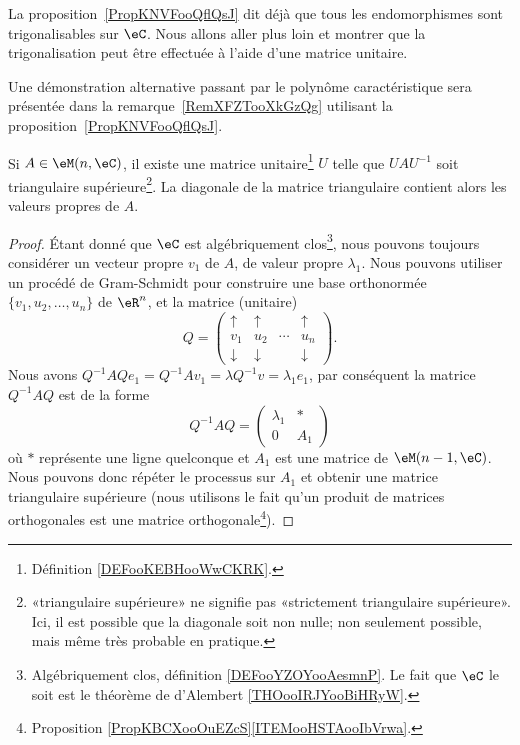 La proposition~\ref{PropKNVFooQflQsJ} dit déjà que tous les endomorphismes sont trigonalisables sur \( \eC\). Nous allons aller plus loin et montrer que la trigonalisation peut être effectuée à l'aide d'une matrice unitaire.

Une démonstration alternative passant par le polynôme caractéristique sera présentée dans la remarque~\ref{RemXFZTooXkGzQg} utilisant la proposition~\ref{PropKNVFooQflQsJ}.
\begin{lemma}  \label{LemSchurComplHAftTq}
    Si \( A\in\eM(n,\eC)\), il existe une matrice unitaire\footnote{Définition \ref{DEFooKEBHooWwCKRK}.} \( U\) telle que \( UAU^{-1}\) soit triangulaire supérieure\footnote{«triangulaire supérieure» ne signifie pas «strictement triangulaire supérieure». Ici, il est possible que la diagonale soit non nulle; non seulement possible, mais même très probable en pratique.}. La diagonale de la matrice triangulaire contient alors les valeurs propres de \( A\).
\end{lemma}

\begin{proof}
	Étant donné que \( \eC\) est algébriquement clos\footnote{Algébriquement clos, définition \ref{DEFooYZOYooAesmnP}. Le fait que \( \eC\) le soit est le théorème de d'Alembert \ref{THOooIRJYooBiHRyW}.}, nous pouvons toujours considérer un vecteur propre \( v_1\) de \( A\), de valeur propre \( \lambda_1\). Nous pouvons utiliser un procédé de Gram-Schmidt pour construire une base orthonormée \( \{ v_1,u_2,\ldots, u_n \}\) de \( \eR^n\), et la matrice (unitaire)
	\begin{equation}
		Q=\begin{pmatrix}
			\uparrow   & \uparrow   &        & \uparrow   \\
			v_1        & u_2        & \cdots & u_n        \\
			\downarrow & \downarrow &        & \downarrow
		\end{pmatrix}.
	\end{equation}
	Nous avons \( Q^{-1}AQe_1=Q^{-1} Av_1=\lambda Q^{-1} v=\lambda_1 e_1\), par conséquent la matrice \( Q^{-1} AQ\) est de la forme
	\begin{equation}
		Q^{-1}AQ=\begin{pmatrix}
			\lambda_1 & *   \\
			0         & A_1
		\end{pmatrix}
	\end{equation}
	où \( *\) représente une ligne quelconque et \( A_1\) est une matrice de \( \eM(n-1,\eC)\). Nous pouvons donc répéter le processus sur \( A_1\) et obtenir une matrice triangulaire supérieure (nous utilisons le fait qu'un produit de matrices orthogonales est une matrice orthogonale\footnote{Proposition \ref{PropKBCXooOuEZcS}\ref{ITEMooHSTAooIbVrwa}.}).
\end{proof}

